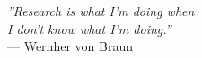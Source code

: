 \null
\vfill

\begin{flushright}
    \textit{''Research is what I’m doing when\\
    I don’t know what I’m doing.''}\\
    — Wernher von Braun
\end{flushright}

\clearpage
